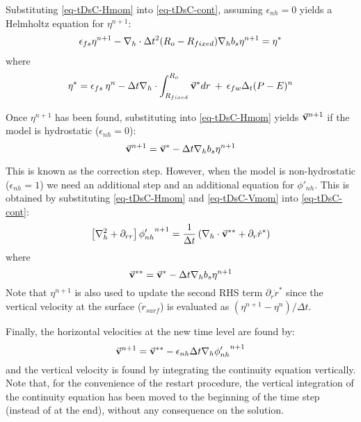 Substituting \ref{eq-tDsC-Hmom} into \ref{eq-tDsC-cont}, assuming
$\epsilon_{nh} = 0$ yields a Helmholtz equation for ${\eta}^{n+1}$:
\begin{eqnarray}
\epsilon_{fs} {\eta}^{n+1} -
{\bf \nabla}_h \cdot \Delta t^2 (R_o-R_{fixed})
{\bf \nabla}_h b_s {\eta}^{n+1}
= {\eta}^*
\label{eq-solve2D}
\end{eqnarray}
where
\begin{eqnarray}
{\eta}^* = \epsilon_{fs} \: {\eta}^{n} -
\Delta t {\bf \nabla}_h \cdot \int_{R_{fixed}}^{R_o} \vec{\bf v}^* dr
\: + \: \epsilon_{fw} \Delta_t (P-E)^{n} 
\label{eq-solve2D_rhs}
\end{eqnarray}

Once ${\eta}^{n+1}$ has been found, substituting into
\ref{eq-tDsC-Hmom} yields $\vec{\bf v}^{n+1}$ if the model is
hydrostatic ($\epsilon_{nh}=0$):
$$
\vec{\bf v}^{n+1} = \vec{\bf v}^{*}
- \Delta t {\bf \nabla}_h b_s {\eta}^{n+1}
$$

This is known as the correction step. However, when the model is
non-hydrostatic ($\epsilon_{nh}=1$) we need an additional step and an
additional equation for $\phi'_{nh}$. This is obtained by substituting
\ref{eq-tDsC-Hmom} and \ref{eq-tDsC-Vmom} into
\ref{eq-tDsC-cont}:
\begin{equation}
\left[ {\bf \nabla}_h^2 + \partial_{rr} \right] {\phi'_{nh}}^{n+1}
= \frac{1}{\Delta t} \left(
{\bf \nabla}_h \cdot \vec{\bf v}^{**} + \partial_r \dot{r}^* \right)
\end{equation}
where
\begin{displaymath}
\vec{\bf v}^{**} = \vec{\bf v}^* - \Delta t {\bf \nabla}_h b_s {\eta}^{n+1}
\end{displaymath}
Note that $\eta^{n+1}$ is also used to update the second RHS term
$\partial_r \dot{r}^* $ since
the vertical velocity at the surface ($\dot{r}_{surf}$) 
is evaluated as $(\eta^{n+1} - \eta^n) / \Delta t$.

Finally, the horizontal velocities at the new time level are found by:
\begin{equation}
\vec{\bf v}^{n+1} = \vec{\bf v}^{**}
- \epsilon_{nh} \Delta t {\bf \nabla}_h {\phi'_{nh}}^{n+1}
\end{equation}
and the vertical velocity is found by integrating the continuity
equation vertically.  Note that, for the convenience of the restart
procedure, the vertical integration of the continuity equation has
been moved to the beginning of the time step (instead of at the end),
without any consequence on the solution.

